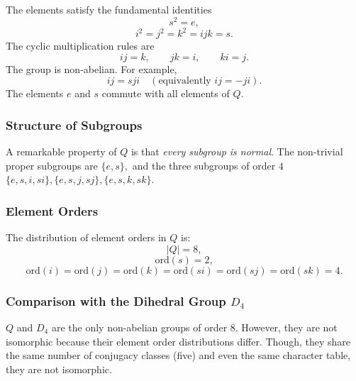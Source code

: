 \documentclass[a4paper,12pt]{article}
\theoremstyle{definition}
\begin{document}
The elements satisfy the fundamental identities
\begin{equation*}
s^2 = e,
\end{equation*}
\begin{equation*}
i^2 = j^2 = k^2 = ijk = s.
\end{equation*}
The cyclic multiplication rules are
\begin{equation*}
ij = k, \qquad jk = i, \qquad ki = j.
\end{equation*}
The group is non-abelian. For example,
\begin{equation*}
ij = sji \quad (\text{equivalently } ij = -ji).
\end{equation*}
The elements $e$ and $s$ commute with all elements of $Q$.

\subsubsection*{Structure of Subgroups}

A remarkable property of $Q$ is that \emph{every subgroup is normal}.  The non-trivial proper subgroups are $\{e, s\},$ and the three subgroups of order $4$ $\{e, s, i, si\}, \{e, s, j, sj\}, \{e, s, k, sk\}.$

\subsubsection*{Element Orders}

The distribution of element orders in $Q$ is:
\begin{equation*}
|Q| = 8,
\end{equation*}
\begin{equation*}
\text{ord}(s) = 2,
\end{equation*}
\begin{equation*}
\text{ord}(i) = \text{ord}(j) = \text{ord}(k) 
= \text{ord}(si) = \text{ord}(sj) = \text{ord}(sk) = 4.
\end{equation*}

\subsubsection*{Comparison with the Dihedral Group $D_4$}

$Q$ and $D_4$ are the only non-abelian groups of order $8$.  
However, they are not isomorphic because their element order distributions differ. Though, they share the same number of conjugacy classes (five) and even the same character table, they are not isomorphic.
\end{document}
